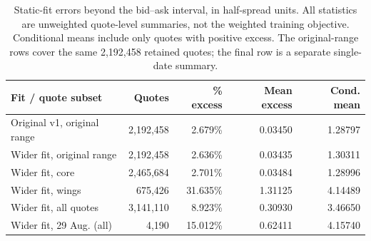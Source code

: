 \begin{table}[H]
\centering\small
\begin{tabular}{lrrrr}
\toprule
Fit / quote subset & Quotes & \% excess & Mean excess & Cond. mean \\
\midrule
Original v1, original range & 2,192,458 & 2.679\% & 0.03450 & 1.28797 \\
Wider fit, original range & 2,192,458 & 2.636\% & 0.03435 & 1.30311 \\
Wider fit, core & 2,465,684 & 2.701\% & 0.03484 & 1.28996 \\
Wider fit, wings & 675,426 & 31.635\% & 1.31125 & 4.14489 \\
Wider fit, all quotes & 3,141,110 & 8.923\% & 0.30930 & 3.46650 \\
Wider fit, 29 Aug. (all) & 4,190 & 15.012\% & 0.62411 & 4.15740 \\
\bottomrule
\end{tabular}
\caption{Static-fit errors beyond the bid--ask interval, in half-spread units. All statistics are unweighted quote-level summaries, not the weighted training objective. Conditional means include only quotes with positive excess. The original-range rows cover the same 2,192,458 retained quotes; the final row is a separate single-date summary.}
\label{tab:wide-static-fit}
\end{table}
